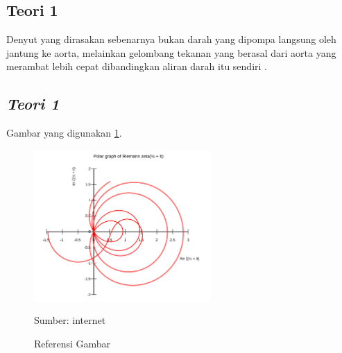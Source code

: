 \subsection{Teori 1} \label{II.teori1}
Denyut yang dirasakan sebenarnya bukan darah yang dipompa langsung oleh jantung ke aorta, melainkan gelombang tekanan yang berasal dari aorta yang merambat lebih cepat dibandingkan aliran darah itu sendiri \cite{Ivanny2014Perbandingan}. \par


\subsection{\textit{Teori 1}} \label{II.teori2}
\lipsum[1-2] %
Gambar yang digunakan \ref{fig:3.ref_gbr}. \par
\begin{figure}[H] %
    \centering
    \includegraphics[width=0.6\textwidth]{figure/zeta.png}
    \caption{Referensi Gambar}
    \label{fig:3.ref_gbr}
    {\footnotesize Sumber: internet}
\end{figure}

